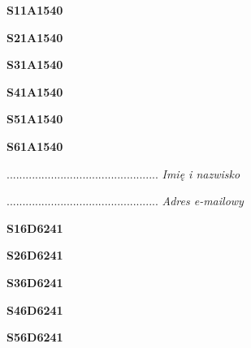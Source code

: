 \begin{turn}{90}\huge \textbf{S11A1540}\end{turn}

\begin{turn}{90}\huge \textbf{S21A1540}\end{turn}

\begin{turn}{90}\huge \textbf{S31A1540}\end{turn}

\begin{turn}{90}\huge \textbf{S41A1540}\end{turn}

\begin{turn}{90}\huge \textbf{S51A1540}\end{turn}

\begin{turn}{90}\huge \textbf{S61A1540}\end{turn}

\begin{turn}{90}\begin{minipage}{\linewidth} \vspace{20mm} ................................................  \textit{Imię i nazwisko}\end{minipage}\end{turn}

\begin{turn}{90}\begin{minipage}{\linewidth} \vspace{20mm} ................................................  \textit{Adres e-mailowy}\end{minipage}\end{turn}

\begin{turn}{90}\huge \textbf{S16D6241}\end{turn}

\begin{turn}{90}\huge \textbf{S26D6241}\end{turn}

\begin{turn}{90}\huge \textbf{S36D6241}\end{turn}

\begin{turn}{90}\huge \textbf{S46D6241}\end{turn}

\begin{turn}{90}\huge \textbf{S56D6241}\end{turn}

